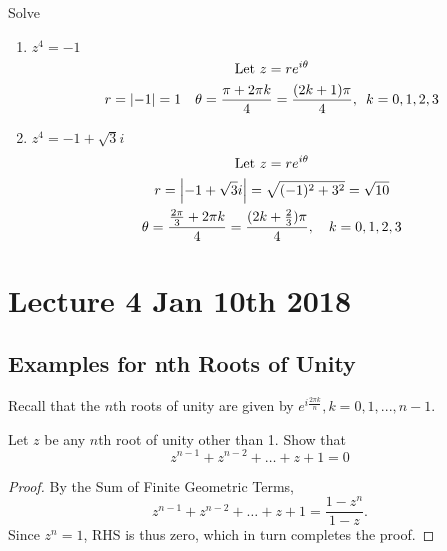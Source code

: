 \documentclass[notoc,notitlepage]{tufte-book}
\begin{document}
\begin{ex}
	Solve
	\begin{enumerate}
		\item $z^4 = -1$
			\begin{gather*}
				\text{Let } z = re^{i \theta} \\
				r = \left|-1\right| = 1 \quad \theta = \frac{\pi + 2 \pi k}{4} = \frac{(2k + 1) \pi}{4}, \enspace k = 0, 1, 2, 3
			\end{gather*}
		\item $z^4 = -1 + \sqrt{3} i$
			\begin{gather*}
				\text{Let } z = re^{i \theta} \\
				r = \left|-1 + \sqrt{3} i\right| = \sqrt{(-1)^2 + 3^2} = \sqrt{10} \\
				\theta = \frac{\frac{2\pi}{3} + 2\pi k}{4} = \frac{(2k + \frac{2}{3}) \pi}{4}, \quad k = 0, 1, 2, 3  
			\end{gather*}
	\end{enumerate}
\end{ex}




\chapter{Lecture 4 Jan 10th 2018}
	\label{chapter:lecture_4_jan_10th_2018}

\section{Examples for nth Roots of Unity} %
\label{sec:examples_for_nth_roots_of_unity}

Recall that the $n$th roots of unity are given by $e^{i \frac{2\pi k}{n}}, k = 0, 1, ..., n - 1$.

\begin{ex}\label{ex:sum of root of unity other than one is negative one}
	Let $z$ be any $n$th root of unity other than 1. Show that
	\begin{equation}
		z^{n - 1} + z^{n - 2} + \hdots + z + 1 = 0
	\end{equation}

	\begin{proof}
		By the Sum of Finite Geometric Terms,
		\begin{equation*}
			z^{n - 1} + z^{n - 2} + \hdots + z + 1 = \frac{1 - z^n}{1 - z}.
		\end{equation*}
		Since $z^n = 1$, RHS is thus zero, which in turn completes the proof.
	\end{proof}
\end{ex}
\end{document}
